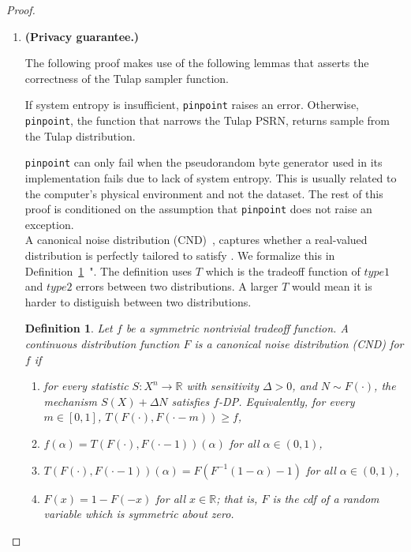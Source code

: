 \documentclass{article}
\newtheorem{defn}{Definition}
\begin{document}
\begin{proof} 
\hfill
\begin{enumerate}
    \item \textbf{(Privacy guarantee.)} 

\begin{tcolorbox}
    \begin{note}
    The following proof makes use of the following lemmas that asserts the correctness of the Tulap sampler function.
    \begin{lemma}
        If system entropy is insufficient, \texttt{pinpoint} raises an error. 
        Otherwise, \texttt{pinpoint}, the function that narrows the Tulap PSRN, 
        returns sample from the Tulap distribution.
    \end{lemma}
    \end{note}
\end{tcolorbox}

\texttt{pinpoint} can only fail when the pseudorandom byte generator used in its implementation fails due to lack of system entropy. 
This is usually related to the computer's physical environment and not the dataset. 
The rest of this proof is conditioned on the assumption that \texttt{pinpoint} does not raise an exception. \\

A canonical noise distribution (CND)~\parencite{awan2023canonical}, 
captures whether a real-valued distribution is perfectly tailored to satisfy . 
We formalize this in Definition~\ref{def2}~\parencite{awan2023canonical}". The definition uses $T$ which is the tradeoff function of $type 1$ and $type 2$ errors between two distributions. A larger $T$ would mean it is harder to distiguish between two distributions.  
\begin{defn}\label{def2}  %
Let $f$ be a symmetric nontrivial tradeoff function. A {continuous} distribution function $F$ is a \emph{canonical noise distribution} (CND) for $f$ if 
\begin{enumerate}[(1)]
    \item for every statistic $S: X^n\rightarrow \mathbb{R}$ with sensitivity $\Delta>0$, and $N\sim F(\cdot)$, 
        the mechanism $S(X) + \Delta N$ satisfies $f$-DP. Equivalently, for every $m\in [0,1]$, $T(F(\cdot),F(\cdot-m))\geq f$,
    \item $f(\alpha)=T(F(\cdot),F(\cdot-1))(\alpha)$ for all $\alpha \in (0,1)$,
    \item $T(F(\cdot),F(\cdot-1))(\alpha) = F(F^{-1}(1-\alpha)-1)$ for all $\alpha \in (0,1)$,
    \item $F(x) = 1-F(-x)$ for all $x\in \mathbb{R}$; that is, $F$ is the cdf of a random variable which is symmetric about zero.
\end{enumerate}
\end{defn}


\end{enumerate}
\end{proof}
\end{document}
